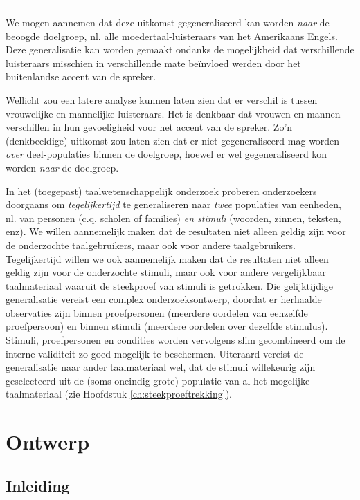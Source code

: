 \documentclass[
]{book}
\begin{document}
\begin{center}\rule{0.5\linewidth}{0.5pt}\end{center}

We mogen aannemen dat deze uitkomst gegeneraliseerd kan worden \emph{naar} de
beoogde doelgroep, nl. alle moedertaal-luisteraars van het Amerikaans
Engels. Deze generalisatie kan worden gemaakt ondanks de mogelijkheid
dat verschillende luisteraars misschien in verschillende mate beïnvloed
werden door het buitenlandse accent van de spreker.

Wellicht zou een latere analyse kunnen laten zien dat er verschil is
tussen vrouwelijke en mannelijke luisteraars. Het is denkbaar dat
vrouwen en mannen verschillen in hun gevoeligheid voor het accent van de
spreker. Zo'n (denkbeeldige) uitkomst zou laten zien dat er niet
gegeneraliseerd mag worden \emph{over} deel-populaties binnen de doelgroep,
hoewel er wel gegeneraliseerd kon worden \emph{naar} de doelgroep.

In het (toegepast) taalwetenschappelijk onderzoek proberen onderzoekers
doorgaans om \emph{tegelijkertijd} te generaliseren naar \emph{twee} populaties
van eenheden, nl. van personen (c.q. scholen of families) \emph{en stimuli}
(woorden, zinnen, teksten, enz). We willen aannemelijk maken dat de
resultaten niet alleen geldig zijn voor de onderzochte taalgebruikers,
maar ook voor andere taalgebruikers. Tegelijkertijd willen we ook
aannemelijk maken dat de resultaten niet alleen geldig zijn voor de
onderzochte stimuli, maar ook voor andere vergelijkbaar taalmateriaal
waaruit de steekproef van stimuli is getrokken. Die gelijktijdige
generalisatie vereist een complex onderzoeksontwerp, doordat er
herhaalde observaties zijn binnen proefpersonen (meerdere oordelen van
eenzelfde proefpersoon) en binnen stimuli (meerdere oordelen over
dezelfde stimulus). Stimuli, proefpersonen en condities worden
vervolgens slim gecombineerd om de interne validiteit zo goed mogelijk
te beschermen. Uiteraard vereist de generalisatie naar ander
taalmateriaal wel, dat de stimuli willekeurig zijn geselecteerd uit de
(soms oneindig grote) populatie van al het mogelijke taalmateriaal (zie
Hoofdstuk \ref{ch:steekproeftrekking}).

\hypertarget{ch:ontwerp}{%
\chapter{Ontwerp}\label{ch:ontwerp}}

\hypertarget{sec:ontwerp-inleiding}{%
\section{Inleiding}\label{sec:ontwerp-inleiding}}
\end{document}
